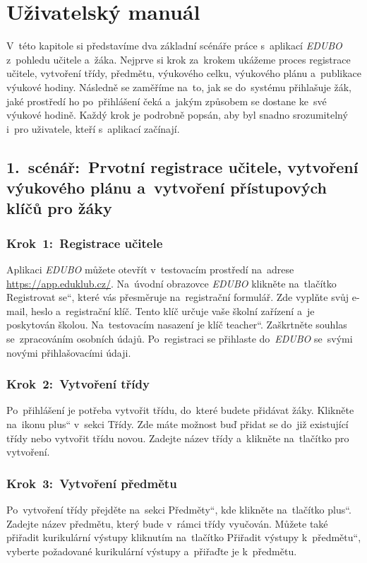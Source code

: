 \documentclass[male,czech,api_bc]{kitheses}
\begin{document}
\section{Uživatelský manuál}

V~této kapitole si představíme dva základní scénáře práce s~aplikací \textit{EDUBO} z~pohledu učitele a~žáka. Nejprve si krok za~krokem ukážeme proces registrace učitele, vytvoření třídy, předmětu, výukového celku, výukového plánu a~publikace výukové hodiny. Následně se zaměříme na~to, jak se do~systému přihlašuje žák, jaké prostředí ho po~přihlášení čeká a~jakým způsobem se dostane ke~své výukové hodině. Každý krok je podrobně popsán, aby byl snadno srozumitelný i~pro uživatele, kteří s~aplikací začínají.

\subsection{1.~scénář:~Prvotní registrace učitele, vytvoření výukového plánu a~vytvoření přístupových klíčů pro žáky}

\subsubsection{Krok~1:~Registrace učitele}
Aplikaci \textit{EDUBO} můžete otevřít v~testovacím prostředí na~adrese \url{https://app.eduklub.cz/}. Na~úvodní obrazovce \textit{EDUBO} klikněte na~tlačítko \quotedblbase Registrovat se``, které vás přesměruje na~registrační formulář. Zde vyplňte svůj e-mail, heslo a~registrační klíč. Tento klíč určuje vaše školní zařízení a~je poskytován školou. Na~testovacím nasazení je klíč \quotedblbase teacher``. Zaškrtněte souhlas se~zpracováním osobních údajů. Po~registraci se přihlaste do~\textit{EDUBO} se~svými novými přihlašovacími údaji.

\subsubsection{Krok~2:~Vytvoření třídy}
Po~přihlášení je potřeba vytvořit třídu, do~které budete přidávat žáky. Klikněte na~ikonu \quotedblbase plus`` v~sekci Třídy. Zde máte možnost buď přidat se do~již existující třídy nebo vytvořit třídu novou. Zadejte název třídy a~klikněte na~tlačítko pro vytvoření.

\subsubsection{Krok~3:~Vytvoření předmětu}
Po~vytvoření třídy přejděte na~sekci \quotedblbase Předměty``, kde klikněte na~tlačítko \quotedblbase plus``. Zadejte název předmětu, který bude v~rámci třídy vyučován. Můžete také přiřadit kurikulární výstupy kliknutím na~tlačítko \quotedblbase Přiřadit výstupy k~předmětu``, vyberte požadované kurikulární výstupy a~přiřaďte je k~předmětu.
\end{document}
